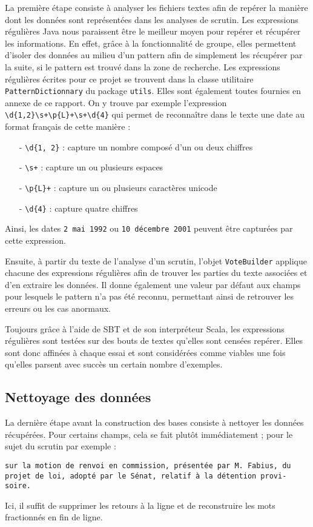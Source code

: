La première étape consiste à analyser les fichiers textes afin de repérer la manière dont les données sont représentées dans les analyses de scrutin. Les expressions régulières Java nous paraissent être le meilleur moyen pour repérer et récupérer les informations. En effet, grâce à la fonctionnalité de groupe, elles permettent d'isoler des données au milieu d'un pattern afin de simplement les récupérer par la suite, si le pattern est trouvé dans la zone de recherche. Les expressions régulières écrites pour ce projet se trouvent dans la classe utilitaire \verb|PatternDictionnary| du package \verb|utils|. Elles sont également toutes fournies en annexe de ce rapport. On y trouve par exemple l'expression \verb|\d{1,2}\s+\p{L}+\s+\d{4}| qui permet de reconnaître dans le texte une date au format français de cette manière :
\begin{itemize}
\item[-] \verb|\d{1, 2}| : capture un nombre composé d'un ou deux chiffres
\item[-] \verb|\s+| : capture un ou plusieurs espaces
\item[-] \verb|\p{L}+| : capture un ou plusieurs caractères unicode
\item[-] \verb|\d{4}| : capture quatre chiffres
\end{itemize}
Ainsi, les dates \verb|2 mai 1992| ou \verb|10 décembre 2001| peuvent être capturées par cette expression.

Ensuite, à partir du texte de l'analyse d'un scrutin, l'objet \verb|VoteBuilder| applique chacune des expressions régulières afin de trouver les parties du texte associées et d'en extraire les données. Il donne également une valeur par défaut aux champs pour lesquels le pattern n'a pas été reconnu, permettant ainsi de retrouver les erreurs ou les cas anormaux.

Toujours grâce à l'aide de SBT et de son interpréteur Scala, les expressions régulières sont testées sur des bouts de textes qu'elles sont censées repérer. Elles sont donc affinées à chaque essai et sont considérées comme viables une fois qu'elles parsent avec succès un certain nombre d'exemples.

\subsection{Nettoyage des données}

La dernière étape avant la construction des bases consiste à nettoyer les données récupérées. Pour certains champs, cela se fait plutôt immédiatement ; pour le sujet du scrutin par exemple :
\begin{verbatim}
sur la motion de renvoi en commission, présentée par M. Fabius, du
projet de loi, adopté par le Sénat, relatif à la détention provi-
soire.
\end{verbatim}
Ici, il suffit de supprimer les retours à la ligne et de reconstruire les mots fractionnés en fin de ligne.

